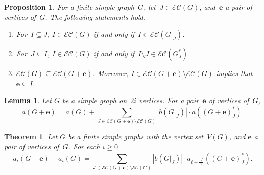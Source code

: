 \documentclass[10pt,a4paper]{amsart}
\newtheorem{proposition}{Proposition}
\newtheorem{lemma}{Lemma}
\newtheorem{theorem}{Theorem}
\newcommand{\EC}{\mathcal{E}\mathcal{C}}
\newcommand{\edge}{\mathbf{e}}
\begin{document}
\begin{proposition}\label{prop:conn}
    For a finite simple graph~$G$, let~$J \in \EC(G)$, and~$\edge$ a pair of vertices of~$G$.
    The following statements hold.
    \begin{enumerate}
      \item\label{prop:conn1} For~$I \subseteq J$, $I \in \EC(G)$ if and only if~$I \in \EC(G\vert_J)$. 
      \item\label{prop:conn2} For~$J \subseteq I$, $I \in \EC(G)$ if and only if~$I \setminus J \in \EC(G^\ast_J)$.
      \item\label{prop:conn3} $\EC(G) \subseteq \EC(G+\edge)$.
    Moreover, $I \in \EC(G+\edge) \setminus \EC(G)$ implies that $\edge \subseteq I$.
    \end{enumerate}
\end{proposition}

\begin{lemma}\label{lemma:decom}
    Let $G$ be a simple graph on~$2i$ vertices.
    For a pair~$\edge$ of vertices of~$G$,
    $$
    a(G+\edge) = a(G) + \sum_{J \in \EC(G+\edge) \setminus \EC(G)} \left\vert b(G\vert_J) \right\vert \cdot a((G+\edge)^\ast_J).
    $$
\end{lemma}

\begin{theorem}\label{thm:decom}
    Let $G$ be a finite simple graphs with the vertex set~$V(G)$, and $\edge$ a pair of vertices of~$G$.
For each $i \geq 0$, 
    \begin{equation} \label{eqn:main_decomp}
    a_i(G+\edge) - a_i(G) = \sum_{J \in \EC(G+\edge) \setminus \EC(G)}\left\vert  b(G\vert_J) \right\vert \cdot a_{i- \frac{|J|}{2}}((G +\edge)^\ast_{J}).
    \end{equation}
\end{theorem}
\end{document}
